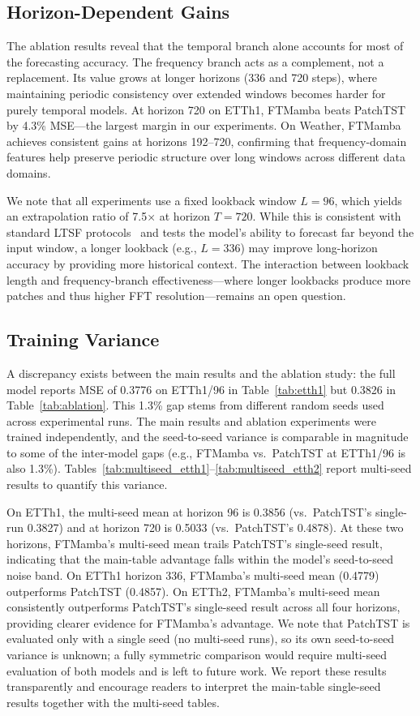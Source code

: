 \documentclass[electronics,article,submit,pdftex,moreauthors]{Definitions/mdpi}
\begin{document}
\subsection{Horizon-Dependent Gains}

The ablation results reveal that the temporal branch alone accounts for most of the forecasting accuracy. The frequency branch acts as a complement, not a replacement. Its value grows at longer horizons (336 and 720 steps), where maintaining periodic consistency over extended windows becomes harder for purely temporal models. At horizon 720 on ETTh1, FTMamba beats PatchTST by 4.3\% MSE---the largest margin in our experiments. On Weather, FTMamba achieves consistent gains at horizons 192--720, confirming that frequency-domain features help preserve periodic structure over long windows across different data domains.

We note that all experiments use a fixed lookback window $L=96$, which yields an extrapolation ratio of 7.5$\times$ at horizon $T=720$. While this is consistent with standard LTSF protocols~\cite{ref6,ref7,ref8} and tests the model's ability to forecast far beyond the input window, a longer lookback (e.g., $L=336$) may improve long-horizon accuracy by providing more historical context. The interaction between lookback length and frequency-branch effectiveness---where longer lookbacks produce more patches and thus higher FFT resolution---remains an open question.

\subsection{Training Variance}

A discrepancy exists between the main results and the ablation study: the full model reports MSE of 0.3776 on ETTh1/96 in Table~\ref{tab:etth1} but 0.3826 in Table~\ref{tab:ablation}. This 1.3\% gap stems from different random seeds used across experimental runs. The main results and ablation experiments were trained independently, and the seed-to-seed variance is comparable in magnitude to some of the inter-model gaps (e.g., FTMamba vs.\ PatchTST at ETTh1/96 is also 1.3\%). Tables~\ref{tab:multiseed_etth1}--\ref{tab:multiseed_etth2} report multi-seed results to quantify this variance.

On ETTh1, the multi-seed mean at horizon 96 is 0.3856 (vs.\ PatchTST's single-run 0.3827) and at horizon 720 is 0.5033 (vs.\ PatchTST's 0.4878). At these two horizons, FTMamba's multi-seed mean trails PatchTST's single-seed result, indicating that the main-table advantage falls within the model's seed-to-seed noise band. On ETTh1 horizon 336, FTMamba's multi-seed mean (0.4779) outperforms PatchTST (0.4857). On ETTh2, FTMamba's multi-seed mean consistently outperforms PatchTST's single-seed result across all four horizons, providing clearer evidence for FTMamba's advantage. We note that PatchTST is evaluated only with a single seed (no multi-seed runs), so its own seed-to-seed variance is unknown; a fully symmetric comparison would require multi-seed evaluation of both models and is left to future work. We report these results transparently and encourage readers to interpret the main-table single-seed results together with the multi-seed tables.
\end{document}
